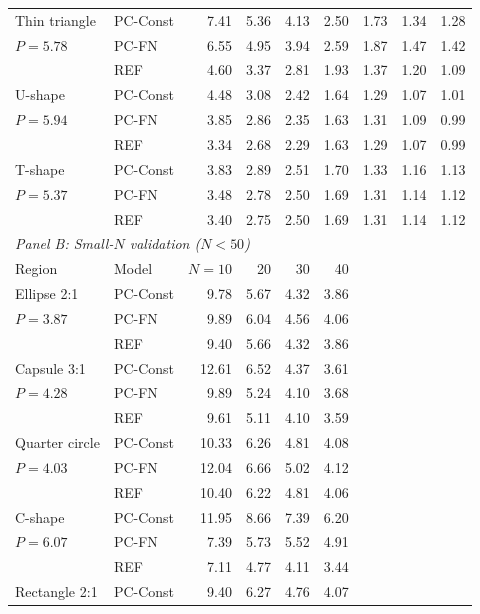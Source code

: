 \begin{table}[htbp]
\begin{tabular}{llrrrrrrr}
\addlinespace[2pt]
Thin triangle & PC-Const & 7.41 & 5.36 & 4.13 & 2.50 & 1.73 & 1.34 & 1.28 \\
$P = 5.78$ & PC-FN & 6.55 & 4.95 & 3.94 & 2.59 & 1.87 & 1.47 & 1.42 \\
 & REF & 4.60 & 3.37 & 2.81 & 1.93 & 1.37 & 1.20 & 1.09 \\
\addlinespace[2pt]
U-shape & PC-Const & 4.48 & 3.08 & 2.42 & 1.64 & 1.29 & 1.07 & 1.01 \\
$P = 5.94$ & PC-FN & 3.85 & 2.86 & 2.35 & 1.63 & 1.31 & 1.09 & 0.99 \\
 & REF & 3.34 & 2.68 & 2.29 & 1.63 & 1.29 & 1.07 & 0.99 \\
\addlinespace[2pt]
T-shape & PC-Const & 3.83 & 2.89 & 2.51 & 1.70 & 1.33 & 1.16 & 1.13 \\
$P = 5.37$ & PC-FN & 3.48 & 2.78 & 2.50 & 1.69 & 1.31 & 1.14 & 1.12 \\
 & REF & 3.40 & 2.75 & 2.50 & 1.69 & 1.31 & 1.14 & 1.12 \\
\midrule
\multicolumn{9}{l}{\textit{Panel B: Small-$N$ validation ($N < 50$)}} \\
\midrule
Region & Model & $N = 10$ & 20 & 30 & 40 &  &  &  \\
\midrule
Ellipse 2:1 & PC-Const & 9.78 & 5.67 & 4.32 & 3.86 &  &  &  \\
$P = 3.87$ & PC-FN & 9.89 & 6.04 & 4.56 & 4.06 &  &  &  \\
 & REF & 9.40 & 5.66 & 4.32 & 3.86 &  &  &  \\
\addlinespace[2pt]
Capsule 3:1 & PC-Const & 12.61 & 6.52 & 4.37 & 3.61 &  &  &  \\
$P = 4.28$ & PC-FN & 9.89 & 5.24 & 4.10 & 3.68 &  &  &  \\
 & REF & 9.61 & 5.11 & 4.10 & 3.59 &  &  &  \\
\addlinespace[2pt]
Quarter circle & PC-Const & 10.33 & 6.26 & 4.81 & 4.08 &  &  &  \\
$P = 4.03$ & PC-FN & 12.04 & 6.66 & 5.02 & 4.12 &  &  &  \\
 & REF & 10.40 & 6.22 & 4.81 & 4.06 &  &  &  \\
\addlinespace[2pt]
C-shape & PC-Const & 11.95 & 8.66 & 7.39 & 6.20 &  &  &  \\
$P = 6.07$ & PC-FN & 7.39 & 5.73 & 5.52 & 4.91 &  &  &  \\
 & REF & 7.11 & 4.77 & 4.11 & 3.44 &  &  &  \\
\addlinespace[2pt]
Rectangle 2:1 & PC-Const & 9.40 & 6.27 & 4.76 & 4.07 &  &  &  \\

\end{tabular}
\end{table}
